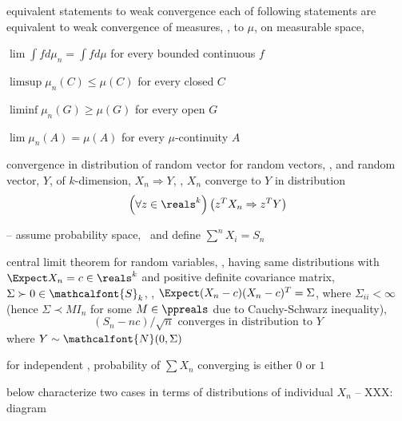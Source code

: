 \documentclass[17pt,landscape]{foils}
\newcommand\normal{\mathcalfont{N}}
\newcommand{\algF}{\algk{F}}
\newcommand{\algR}{\algk{R}}
\begin{document}
{\begin{mytheorem}{equivalent statements to weak convergence}
	each of following statements are equivalent to
	weak convergence of measures, , to $\mu$,
	on measurable space, \measu{\reals^k}{\algR^k}\

	\bit
		\item $\lim \int f d\mu_n = \int f d\mu$ for every bounded continuous $f$
		\item $\limsup \mu_n(C) \leq \mu(C)$ for every closed $C$
		\item $\liminf \mu_n(G) \geq \mu(G)$ for every open $G$
		\item $\lim \mu_n(A) = \mu(A)$ for every $\mu$-continuity $A$
	\eit
\end{mytheorem}

\begin{mytheorem}{convergence in distribution of random vector}
	for random vectors, , and random vector, $Y$, of $k$-dimension,
	$X_n\Rightarrow Y$, \ie, $X_n$ converge to $Y$ in distribution
		\iaoi\
	$$
		\left(
			\forall z\in \reals^k
		\right)
		\left(
			z^T X_n \Rightarrow z^T Y
		\right)
	$$

\end{mytheorem}


%

-- assume probability space, \meas{\Omega}{\algF}{P}\ and define $\sum^n X_i = S_n$\


\begin{mytheorem}{central limit theorem}
	for random variables, , having same distributions with $\Expect X_n = c\in\reals^k$
	and positive definite covariance matrix, $\Sigma\succ0\in\mathcalfont{S}_k$,
	\ie, $\Expect(X_n-c)(X_n-c)^T = \Sigma$,
	where $\Sigma_{ii} < \infty$ (hence $\Sigma \prec M I_n$ for some $M\in\ppreals$ due to Cauchy-Schwarz inequality),
	$$
		(S_n -nc)/\sqrt{n} \mbox{ converges in distribution to } Y
	$$
	where $Y \sim \normal(0,\Sigma)$
\end{mytheorem}




%

\bit
\item
	for independent , probability of $\sum X_n$ converging is either $0$ or $1$
\item
	below characterize two cases in terms of distributions of individual $X_n$
	-- XXX: diagram
\eit

}
\end{document}
